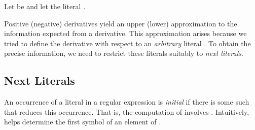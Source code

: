 \begin{example}\label{exp:nderivatives}
  Let  be
   and
  let the literal . 
  
\end{example}
Positive (negative) derivatives yield an upper (lower)
approximation to the information expected from a derivative.
This approximation arises because we tried to define the derivative
with respect to an \emph{arbitrary} literal . 
To obtain the precise information, we need to restrict these literals
suitably to \emph{next literals}.

\subsection{Next Literals}
\label{sec:next}

An occurrence of a literal  in a regular expression  is \emph{initial} if there is
some  such that  reduces this occurrence. That is,
the computation of  involves . Intuitively,
 helps determine the first symbol of an element of .
